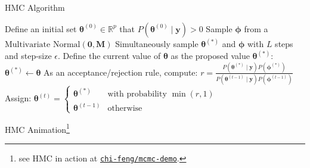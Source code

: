 \begin{frame}[fragile]{HMC Algorithm}
	\SetAlCapFnt{\normalsize}
	\SetAlCapNameFnt{\normalsize}
	\begin{algorithm}[H]
		\DontPrintSemicolon
		\SetAlgoNoEnd
		\SetAlgoLined
		\footnotesize
		Define an initial set $\boldsymbol{\theta}^{(0)} \in \mathbb{R}^p$ that $P\left(\boldsymbol{\theta}^{(0)} \mid \mathbf{y} \right) > 0$\;
		Sample $\boldsymbol{\phi}$ from a $\text{Multivariate Normal}(\mathbf{0},\mathbf{M})$\;
		Simultaneously sample $\boldsymbol{\theta}^{(*)}$ and $\boldsymbol{\phi}$ with $L$ steps and step-size $\epsilon$.\;
		Define the current value of $\boldsymbol{\theta}$ as the proposed value $\boldsymbol{\theta}^{(*)}$:
		$\boldsymbol{\theta}^{(*)} \leftarrow \boldsymbol{\theta}$\;
		As an acceptance/rejection rule, compute:
		$r = \frac{P \left(\boldsymbol{\theta}^{(*)} \mid \mathbf{y} \right) P \left(\boldsymbol{\phi}^{(*)} \right)}{P \left(\boldsymbol{\theta}^{(t-1)} \mid \mathbf{y} \right) P \left(\boldsymbol{\phi}^{(t-1)} \right)}$\;
		Assign:
		$
			\boldsymbol{\theta}^{(t)} =
			\begin{cases}
				\boldsymbol{\theta}^{(*)}   & \text{with probability $\min(r,1)$} \\
				\boldsymbol{\theta}^{(t-1)} & \text{otherwise}
			\end{cases}
		$\;
		\caption{Hamiltonian Monte Carlo (HMC)}
	\end{algorithm}
\end{frame}

\begin{frame}{HMC Animation\footnote{see HMC in action at \href{https://chi-feng.github.io/mcmc-demo/app.html?algorithm=HamiltonianHMC&target=banana}{\texttt{chi-feng/mcmc-demo}}.}}
	\centering
\end{frame}

